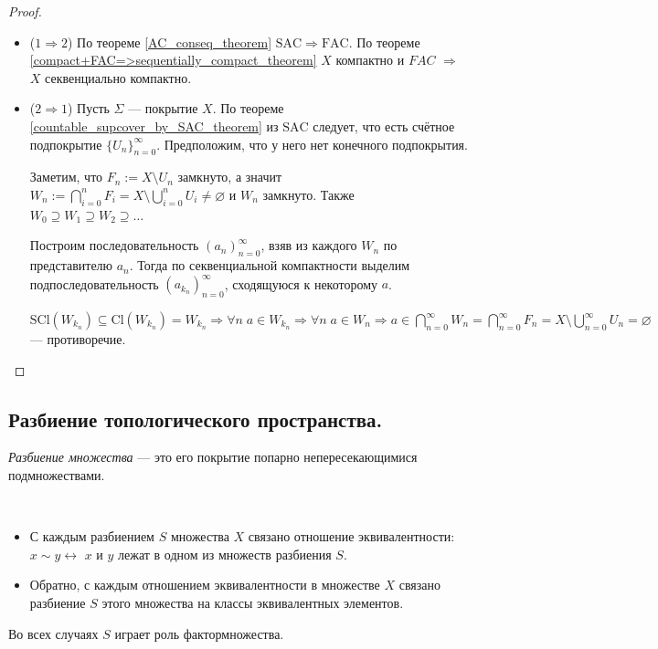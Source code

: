 \documentclass[12pt,a4paper]{article}
\newcommand{\Cl}{\ensuremath{\mathrm{Cl}}\xspace}
\newcommand{\SCl}{\ensuremath{\mathrm{SCl}}\xspace}
\newcommand{\FAC}{\ensuremath{\mathrm{FAC}}\xspace}
\newcommand{\SAC}{\ensuremath{\mathrm{SAC}}\xspace}
\begin{document}
    \begin{proof}\ 
        \begin{itemize}
            \item ($1 \Rightarrow 2$) По теореме \ref{AC_conseq_theorem} $\SAC \Rightarrow \FAC$. По теореме \ref{compact+FAC=>sequentially_compact_theorem} $X$ компактно и $FAC$ $\Rightarrow$ $X$ секвенциально компактно.
            \item ($2 \Rightarrow 1$) Пусть $\Sigma$ --- покрытие $X$. По теореме \ref{countable_supcover_by_SAC_theorem} из \SAC следует, что есть счётное подпокрытие $\{U_n\}_{n=0}^\infty$. Предположим, что у него нет конечного подпокрытия.

            Заметим, что $F_n := X \setminus U_n$ замкнуто, а значит $W_n := \bigcap_{i=0}^n F_i = X \setminus \bigcup_{i=0}^n U_i \neq \varnothing$ и $W_n$ замкнуто. Также $W_0 \supseteq W_1 \supseteq W_2 \supseteq \dots$

            Построим последовательность $(a_n)_{n=0}^\infty$, взяв из каждого $W_n$ по представителю $a_n$. Тогда по секвенциальной компактности выделим подпоследовательность $(a_{k_n})_{n=0}^\infty$, сходящуюся к некоторому $a$.

            $\SCl(W_{k_n}) \subseteq \Cl(W_{k_n}) = W_{k_n} \Rightarrow \forall n\; a \in W_{k_n} \Rightarrow \forall n\; a \in W_n \Rightarrow a \in \bigcap_{n=0}^\infty W_n = \bigcap_{n=0}^\infty F_n = X \setminus \bigcup_{n=0}^\infty U_n = \varnothing$ --- противоречие.
        \end{itemize}
    \end{proof}

    \subsection{Разбиение топологического пространства.}

    \begin{definition}
        \emph{Разбиение множества} --- это его покрытие попарно непересекающимися подмножествами.
    \end{definition}

    \begin{remark*}\ 
        \begin{itemize}
            \item С каждым разбиением $S$ множества $X$ связано отношение эквивалентности: $x \sim y \leftrightarrow$ $x$ и $y$ лежат в одном из множеств разбиения $S$.
            \item Обратно, с каждым отношением эквивалентности в множестве $X$ связано разбиение $S$ этого множества на классы эквивалентных элементов.
        \end{itemize}
        Во всех случаях $S$ играет роль фактормножества.
    \end{remark*}
\end{document}
